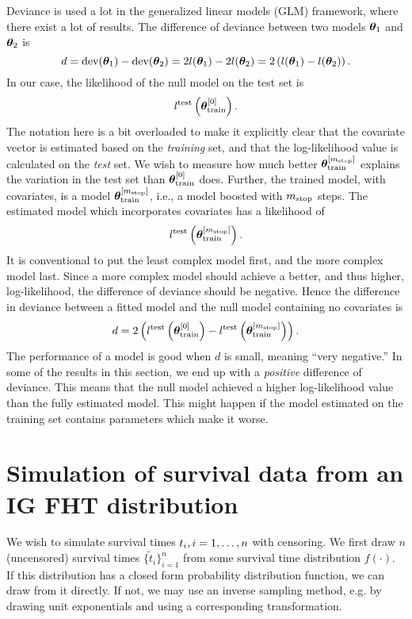 Deviance is used a lot in the generalized linear models (GLM) framework, where there exist a lot of results.
The difference of deviance between two models $\boldsymbol{\theta}_1$ and $\boldsymbol{\theta}_2$ is
\begin{equation}
    d=\text{dev}(\boldsymbol{\theta}_1)-\text{dev}(\boldsymbol{\theta}_2)=2l(\boldsymbol{\theta}_1)-2l(\boldsymbol{\theta}_2)=2\left(l(\boldsymbol{\theta}_1)-l(\boldsymbol{\theta}_2)\right).
\end{equation}
In our case, the likelihood of the null model on the test set is
\begin{equation}
    l^{\text{test}}\left(\boldsymbol{\theta}^{[0]}_{\text{train}}\right).
\end{equation}
The notation here is a bit overloaded to make it explicitly clear that the covariate vector is estimated based on the \textit{training} set, and that the log-likelihood value is calculated on the \textit{test} set.
We wish to measure how much better $\boldsymbol{\theta}_{\text{train}}^{[m_{\text{stop}}]}$ explains the variation in the test set than $\boldsymbol{\theta}_{\text{train}}^{[0]}$ does.
Further, the trained model, with covariates, is a model $\boldsymbol{\theta}^{[m_{\text{stop}}]}_{\text{train}}$, i.e., a model boosted with $m_{\text{stop}}$ steps.
The estimated model which incorporates covariates has a likelihood of
\begin{equation}
    l^{\text{test}}\left(\boldsymbol{\theta}^{[m_{\text{stop}}]}_{\text{train}}\right).
\end{equation}
It is conventional to put the least complex model first, and the more complex model last.
Since a more complex model should achieve a better, and thus higher, log-likelihood, the difference of deviance should be negative. 
Hence the difference in deviance between a fitted model and the null model containing no covariates is
\begin{equation*}
    d=2\left(l^{\text{test}}\left(\boldsymbol{\theta}^{[0]}_{\text{train}}\right)-l^{\text{test}}\left(\boldsymbol{\theta}^{[m_{\text{stop}}]}_{\text{train}}\right)\right).
\end{equation*}
The performance of a model is good when $d$ is small, meaning ``very negative.''
In some of the results in this section, we end up with a \textit{positive} difference of deviance.
This means that the null model achieved a higher log-likelihood value than the fully estimated model.
This might happen if the model estimated on the training set contains parameters which make it worse.

\section{Simulation of survival data from an IG FHT distribution}\label{sec:simulate-IG-data}
We wish to simulate survival times $t_{i},i=1,\ldots,n$ with censoring.
We first draw $n$ (uncensored) survival times $\{\tilde{t}_i\}_{i=1}^n$ from some survival time distribution $f(\cdot)$.
If this distribution has a closed form probability distribution function, we can draw from it directly.
If not, we may use an inverse sampling method, e.g. by drawing unit exponentials and using a corresponding transformation.


